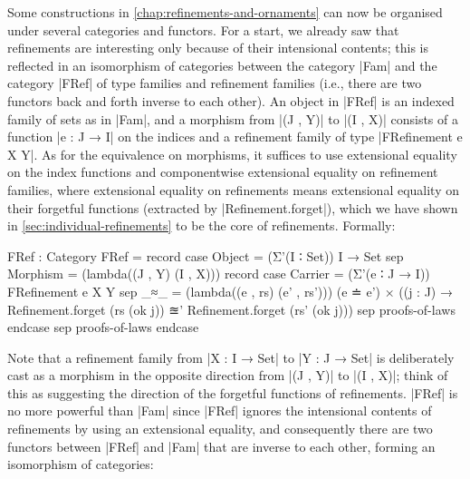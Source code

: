 Some constructions in \autoref{chap:refinements-and-ornaments} can now be organised under several categories and functors.
For a start, we already saw that refinements are interesting only because of their intensional contents; this is reflected in an isomorphism of categories between the category |Fam| and the category |FRef| of type families and refinement families (i.e., there are two functors back and forth inverse to each other).
An object in |FRef| is an indexed family of sets as in |Fam|, and a morphism from |(J , Y)| to |(I , X)| consists of a function |e : J → I| on the indices and a refinement family of type |FRefinement e X Y|.
As for the equivalence on morphisms, it suffices to use extensional equality on the index functions and componentwise extensional equality on refinement families, where extensional equality on refinements means extensional equality on their forgetful functions (extracted by |Refinement.forget|), which we have shown in \autoref{sec:individual-refinements} to be the core of refinements.
Formally:
\begin{code}
FRef : Category
FRef = record
  case  Object    =  (Σ'(I ∶ Set)) I → Set
  sep   Morphism  =  (lambda((J , Y) (I , X))) record
                       case  Carrier = (Σ'(e ∶ J → I)) FRefinement e X Y
                       sep   _≈_ =  (lambda((e , rs) (e' , rs')))
                                      (e ≐ e') ×
                                      ((j : J) →  Refinement.forget (rs   (ok j)) ≊'
                                                  Refinement.forget (rs'  (ok j)))
                       sep  proofs-of-laws endcase
  sep   proofs-of-laws endcase
\end{code}
Note that a refinement family from |X : I → Set| to |Y : J → Set| is deliberately cast as a morphism in the opposite direction from |(J , Y)| to |(I , X)|; think of this as suggesting the direction of the forgetful functions of refinements.
|FRef| is no more powerful than |Fam| since |FRef| ignores the intensional contents of refinements by using an extensional equality, and consequently there are two functors between |FRef| and |Fam| that are inverse to each other, forming an isomorphism of categories:
